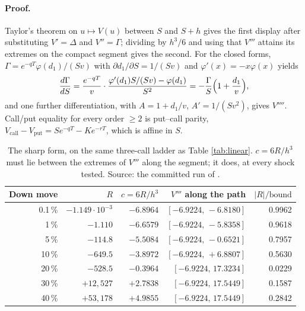 \documentclass[11pt,a4paper]{article}
\begin{document}
\noindent{}

\paragraph{Proof.}
Taylor's theorem on $u \mapsto V(u)$ between $S$ and $S + h$ gives the first display after
substituting $V' = \Delta$ and $V'' = \Gamma$; dividing by $h^3/6$ and using that $V'''$ attains its
extremes on the compact segment gives the second. For the closed forms, $\Gamma = e^{-qT}\varphi(d_1)/(Sv)$
with $\partial d_1/\partial S = 1/(Sv)$ and $\varphi'(x) = -x\varphi(x)$ yields
\[
  \frac{d\Gamma}{dS}
  = \frac{e^{-qT}}{v}\cdot\frac{\varphi'(d_1)S/(Sv) - \varphi(d_1)}{S^2}
  = -\frac{\Gamma}{S}\Bigl(1 + \frac{d_1}{v}\Bigr),
\]
and one further differentiation, with $A = 1 + d_1/v$, $A' = 1/(Sv^2)$, gives $V''''$. Call/put
equality for every order $\ge 2$ is put--call parity, $V_{\text{call}} - V_{\text{put}} =
Se^{-qT} - Ke^{-rT}$, which is affine in $S$.


\begin{table}[t]
\caption[The Lagrange coefficient trapped by the path's own range of V''']{The sharp form, on the
same three-call ladder as Table \ref{tab:linear}. $c = 6R/h^3$ must lie between the extremes
of $V'''$ along the segment; it does, at every shock tested. Source: the committed run of
.}
\label{tab:bound}
\centering\small
\begin{tabular}{rrrrr}
\toprule
Down move & $R$ & $c = 6R/h^3$ & $V'''$ along the path & $\lvert R\rvert/\text{bound}$ \\
\midrule
0.1\,\%  & $-1.149\cdot10^{-3}$ & $-6.8964$ & $[-6.9224,\,-6.8180]$ & 0.9962 \\
1\,\%    & $-1.110$             & $-6.6579$ & $[-6.9224,\,-5.8358]$ & 0.9618 \\
5\,\%    & $-114.8$             & $-5.5084$ & $[-6.9224,\,-0.6521]$ & 0.7957 \\
10\,\%   & $-649.5$             & $-3.8972$ & $[-6.9224,\,+6.8807]$ & 0.5630 \\
20\,\%   & $-528.5$             & $-0.3964$ & $[-6.9224,\,17.3234]$ & 0.0229 \\
30\,\%   & $+12{,}527$          & $+2.7838$ & $[-6.9224,\,17.5449]$ & 0.1587 \\
40\,\%   & $+53{,}178$          & $+4.9855$ & $[-6.9224,\,17.5449]$ & 0.2842 \\
\bottomrule
\end{tabular}
\end{table}
\end{document}
